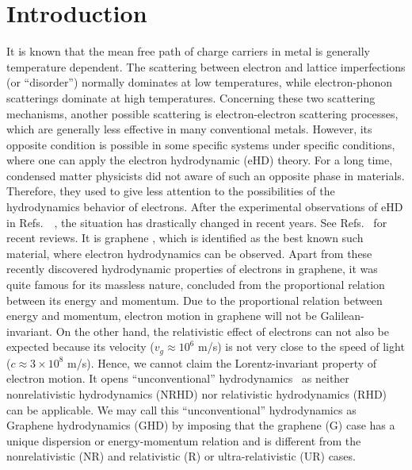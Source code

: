 \documentclass[%
 reprint,
 amsmath,amssymb,
 aps,
]{revtex4-2}
\begin{document}
%
\maketitle
%
\section{Introduction} 
    It is known that the mean free path of charge carriers in metal is generally temperature dependent. The scattering between electron and lattice imperfections (or “disorder”) normally dominates at low temperatures, while electron-phonon scatterings dominate at high temperatures. Concerning these two scattering mechanisms, another possible scattering is electron-electron scattering processes, which are generally less effective in many conventional metals. However, its opposite condition is possible in some specific systems under specific conditions, where one can apply the electron hydrodynamic (eHD) theory. For a long time, condensed matter physicists did not aware of such an opposite phase in materials. Therefore, they used to give less attention to the possibilities of the hydrodynamics behavior of electrons. After the experimental observations of eHD in Refs.~\cite{1Ku:2019lgj,2varnavides2020electron,3PhysRevB.103.125106,4PhysRevB.103.235152,5PhysRevB.103.155128,6PhysRevResearch.3.013290,7DiSante:2019zrd,8PhysRevB.103.115402,9sulpizio2019visualizing,10gallagher2019quantum,11doi:10.1126/science.aau0685,12ella2019simultaneous,13bandurin2018fluidity,18doi:10.1126/science.aad0201,14PhysRevB.98.241304,15jaoui2018departure,16doi:10.1126/science.aac8385,17doi:10.1126/science.aad0343}~, the situation has drastically changed in recent years. See Refs.~\cite{eHD1,eHD2,eHD3} for recent reviews. It is graphene \cite{1Ku:2019lgj,2varnavides2020electron,3PhysRevB.103.125106,4PhysRevB.103.235152,5PhysRevB.103.155128,6PhysRevResearch.3.013290,7DiSante:2019zrd,8PhysRevB.103.115402,9sulpizio2019visualizing,10gallagher2019quantum,11doi:10.1126/science.aau0685,12ella2019simultaneous,13bandurin2018fluidity,18doi:10.1126/science.aad0201}, which is identified as the best known such material, where electron hydrodynamics can be observed. Apart from these recently discovered hydrodynamic properties of electrons in graphene, it was quite famous for its massless nature, concluded from the proportional relation between its energy and momentum. Due to the proportional relation between energy and momentum, electron motion in graphene will not be Galilean-invariant. On the other hand, the relativistic effect of electrons can not also be expected because its velocity ($v_g\approx 10^6$ m/s) is not very close to the speed of light ($c\approx 3\times 10^8$ m/s). Hence, we cannot claim the Lorentz-invariant property of electron motion. It opens “unconventional” hydrodynamics~\cite{eHD2} as neither nonrelativistic hydrodynamics (NRHD) nor relativistic hydrodynamics (RHD) can be applicable. We may call this “unconventional” hydrodynamics as Graphene hydrodynamics (GHD) by imposing that the graphene (G) case has a unique dispersion or energy-momentum relation and is different from the nonrelativistic (NR) and relativistic (R) or ultra-relativistic (UR) cases.
\end{document}

